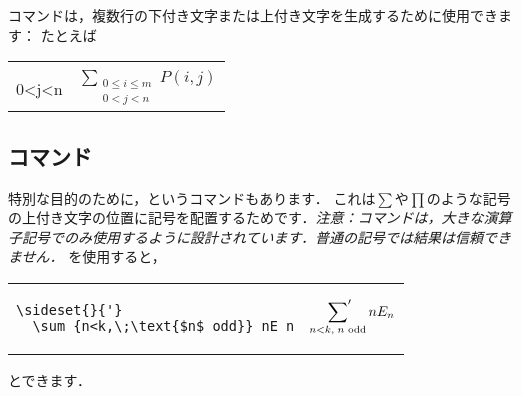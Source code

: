 コマンドは，複数行の下付き文字または上付き文字を生成するために使用できます：
\relax
{}
たとえば
\begin{center}
\begin{tabular}{ll}
\begin{minipage}[t]{.6\columnwidth}
\begin{verbatim}
\sum_{\substack{
         0\le i\le m\\
         0<j<n}}
  P(i,j)
\end{verbatim}
\end{minipage}
&
$\displaystyle
\sum_{\substack{0\le i\le m\\ 0<j<n}} P(i,j)$
\end{tabular}
\end{center}

\subsection{コマンド}\label{sideset}

特別な目的のために，というコマンドもあります．
これは$\sum$や$\prod $のような記号の上付き文字の位置に記号を配置するためです．\emph{注意：コマンドは，大きな演算子記号でのみ使用するように設計されています．普通の記号では結果は信頼できません．}
を使用すると，
\begin{center}
\begin{tabular}{ll}
\begin{minipage}[t]{.6\columnwidth}
\begin{verbatim}
\sideset{}{'}
  \sum_{n<k,\;\text{$n$ odd}} nE_n
\end{verbatim}
\end{minipage}
&$\displaystyle
\sideset{}{'}\sum_{n<k,\;\text{$n$ odd}} nE_n
$
\end{tabular}
\end{center}
とできます．

